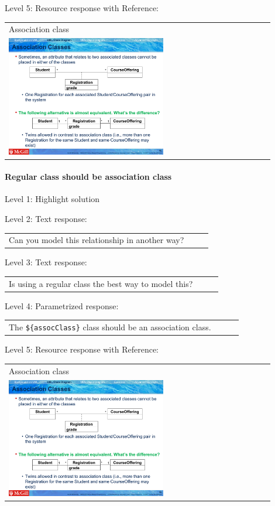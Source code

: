\noindent Level 5: Resource response with Reference: \medskip

\begin{tabular}{|p{0.9\linewidth}}
Association class

\\
\includegraphics[width=0.6\textwidth]{images/association_class.png}
\end{tabular} \medskip


\paragraph{Regular class should be association class}

\noindent Level 1: Highlight solution \medskip

\noindent Level 2: Text response: \medskip

\begin{tabular}{|p{0.9\linewidth}}
Can you model this relationship in another way?
\end{tabular} \medskip

\noindent Level 3: Text response: \medskip

\begin{tabular}{|p{0.9\linewidth}}
Is using a regular class the best way to model this?
\end{tabular} \medskip

\noindent Level 4: Parametrized response: \medskip

\begin{tabular}{|p{0.9\linewidth}}
The \verb|${assocClass}| class should be an association class.
\end{tabular} \medskip

\noindent Level 5: Resource response with Reference: \medskip

\begin{tabular}{|p{0.9\linewidth}}
Association class

\\
\includegraphics[width=0.6\textwidth]{images/association_class.png}
\end{tabular} \medskip


